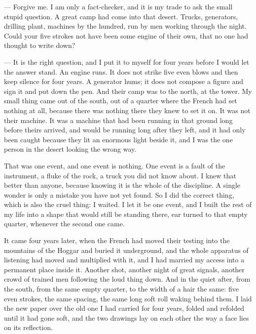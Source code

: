 \begin{room}

--- Forgive me. I am only a fact-checker, and it is my trade to ask the small stupid question. A great camp had come into that desert. Trucks, generators, drilling plant, machines by the hundred, run by men working through the night. Could your five strokes not have been some engine of their own, that no one had thought to write down?

--- It is the right question, and I put it to myself for four years before I would let the answer stand. An engine runs. It does not strike five even blows and then keep silence for four years. A generator hums; it does not compose a figure and sign it and put down the pen. And their camp was to the north, at the tower. My small thing came out of the south, out of a quarter where the French had set nothing at all, because there was nothing there they knew to set it on. It was not their machine. It was a machine that had been running in that ground long before theirs arrived, and would be running long after they left, and it had only been caught because they lit an enormous light beside it, and I was the one person in the desert looking the wrong way.

\end{room}

\ornament

That was one event, and one event is nothing. One event is a fault of the instrument, a fluke of the rock, a truck you did not know about. I knew that better than anyone, because knowing it is the whole of the discipline. A single wonder is only a mistake you have not yet found. So I did the correct thing, which is also the cruel thing: I waited. I let it be one event, and I built the rest of my life into a shape that would still be standing there, ear turned to that empty quarter, whenever the second one came.\par

It came four years later, when the French had moved their testing into the mountains of the Hoggar and buried it underground, and the whole apparatus of listening had moved and multiplied with it, and I had married my access into a permanent place inside it. Another shot, another night of great signals, another crowd of trained men following the loud thing down. And in the quiet after, from the south, from the same empty quarter, to the width of a hair the same: five even strokes, the same spacing, the same long soft roll waking behind them. I laid the new paper over the old one I had carried for four years, folded and refolded until it had gone soft, and the two drawings lay on each other the way a face lies on its reflection.\par

